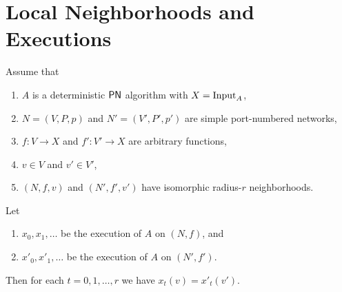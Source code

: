 \section{Local Neighborhoods and Executions}

\begin{theorem}\label{thm:local-neighborhood}
    Assume that
    \begin{enumerate}[itemsep=0ex]\raggedright
        \item $A$ is a deterministic $\textup{\sffamily PN}$ algorithm with $X = \operatorname{Input}_A$,
        \item $N = (V,P,p)$ and $N' = (V'\!,P'\!,p')$ are simple port-numbered networks,
        \item $f\colon V \to X$ and $f'\colon V' \to X$ are arbitrary functions,
        \item $v \in V$ and $v' \in V'$,
        \item $(N,f,v)$ and $(N'\!,f'\!,v')$ have isomorphic radius-$r$ neighborhoods.
    \end{enumerate}
    Let
    \begin{enumerate}[resume*]
        \item $x_0, x_1, \dotsc$ be the execution of $A$ on $(N,f)$, and
        \item $x'_0, x'_1, \dotsc$ be the execution of $A$ on $(N'\!,f')$.
    \end{enumerate}
    Then for each $t = 0, 1, \dotsc, r$ we have $x_t(v) = x'_t(v')$.
\end{theorem}

